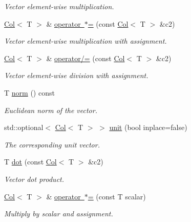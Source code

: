 \begin{DoxyCompactItemize}
\begin{DoxyCompactList}\small\item\em Vector element-\/wise multiplication. \end{DoxyCompactList}\item 
\mbox{\hyperlink{classtao_1_1_col}{Col}}$<$ T $>$ \& \mbox{\hyperlink{classtao_1_1_col_a9274e5a0efd840c97741d05dca7bd5a2}{operator $\ast$=}} (const \mbox{\hyperlink{classtao_1_1_col}{Col}}$<$ T $>$ \&c2)
\begin{DoxyCompactList}\small\item\em Vector element-\/wise multiplication with assignment. \end{DoxyCompactList}\item 
\mbox{\hyperlink{classtao_1_1_col}{Col}}$<$ T $>$ \& \mbox{\hyperlink{classtao_1_1_col_ab51f1d091fdb1b5a6a4199f4253ecfaa}{operator/=}} (const \mbox{\hyperlink{classtao_1_1_col}{Col}}$<$ T $>$ \&c2)
\begin{DoxyCompactList}\small\item\em Vector element-\/wise division with assignment. \end{DoxyCompactList}\item 
T \mbox{\hyperlink{classtao_1_1_col_a229cd5a26d1fa4424150329127ca31d5}{norm}} () const
\begin{DoxyCompactList}\small\item\em Euclidean norm of the vector. \end{DoxyCompactList}\item 
std\+::optional$<$ \mbox{\hyperlink{classtao_1_1_col}{Col}}$<$ T $>$ $>$ \mbox{\hyperlink{classtao_1_1_col_ae913e98d4ed12cc7ee1975b2aff07c05}{unit}} (bool inplace=false)
\begin{DoxyCompactList}\small\item\em The corresponding unit vector. \end{DoxyCompactList}\item 
T \mbox{\hyperlink{classtao_1_1_col_a605b320d536f27395162eff375af8514}{dot}} (const \mbox{\hyperlink{classtao_1_1_col}{Col}}$<$ T $>$ \&c2)
\begin{DoxyCompactList}\small\item\em Vector dot product. \end{DoxyCompactList}\item 
\mbox{\hyperlink{classtao_1_1_col}{Col}}$<$ T $>$ \& \mbox{\hyperlink{classtao_1_1_col_a29c998087d6d7b98ecee1ba9fb7237a9}{operator $\ast$=}} (const T scalar)
\begin{DoxyCompactList}\small\item\em Multiply by scalar and assignment. \end{DoxyCompactList}\item 

\end{DoxyCompactItemize}
